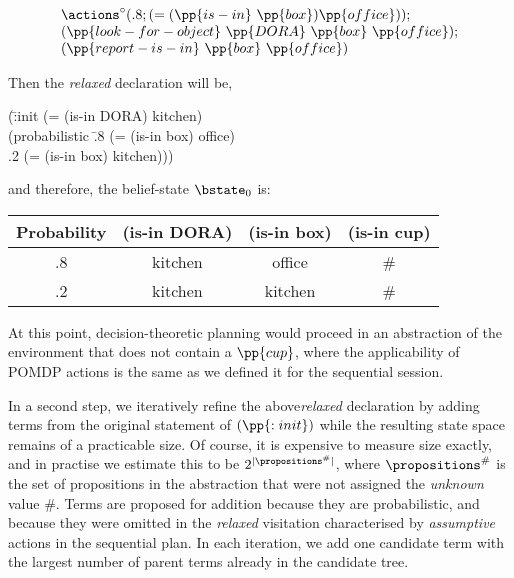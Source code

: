 \[
\begin{array}{l}
\actions^{\circ}(.8;(=(\pp{is-in}~\pp{box})\pp{office}));\\
(\pp{look-for-object}~\pp{DORA}~\pp{box}~\pp{office});\\
(\pp{report-is-in}~\pp{box}~\pp{office})
\end{array}
\]

\noindent Then the {\em relaxed} declaration will be,

\small
\begin{tabtt}
(\=:init (= (is-in DORA) kitchen) \+ \\
       (probabilistic \=.8 (= (is-in box) office)  \\
		      \>.2 (= (is-in box) kitchen))) \\
\end{tabtt}
\normalsize

\noindent and therefore, the belief-state $\bstate_0$ is:

\small
\begin{tabular}{cccc}
\hline
Probability & (is-in DORA)  & (is-in box)  & (is-in cup) \\
\hline
.8 & kitchen & office & \# \\
.2 & kitchen & kitchen & \# \\
\hline
\end{tabular}
\normalsize

\noindent At this point, decision-theoretic planning would proceed in an
abstraction of the environment that does not contain a $\pp{cup}$,
where the applicability of POMDP actions is the same as we
defined it for the sequential session.

In a second step, we iteratively refine the above{\em relaxed}
declaration by adding terms from the original statement of
$(\pp{:init})$ while the resulting state space remains of a
practicable size. Of course, it is expensive to measure size exactly,
and in practise we estimate this to be $2^{|\propositions^\#|}$, where
$\propositions^\#$ is the set of propositions in the abstraction that
were not assigned the {\em unknown} value \#. Terms are proposed for
addition because they are probabilistic, and because they were omitted
in the {\em relaxed} visitation characterised by {\em assumptive}
actions in the sequential plan. In each iteration, we add one
candidate term with the largest number of parent terms already in the
candidate tree.








